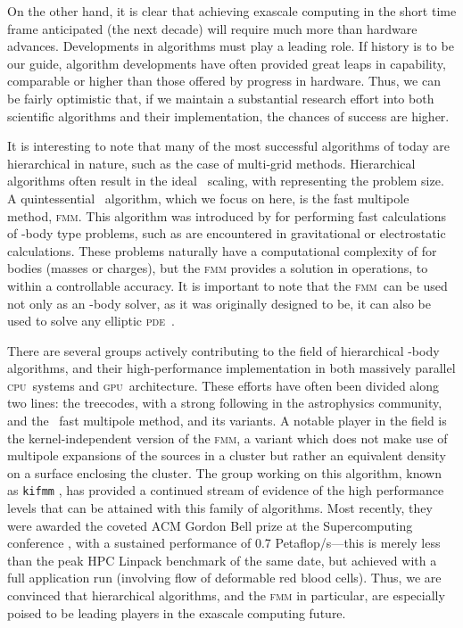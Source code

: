 \documentclass[10pt,twocolumn]{article}
\newcommand{\bigON}{\xspace}
\newcommand{\bigOsq}{\xspace}
\newcommand{\fmm}{\textsc{fmm}\xspace}
\newcommand{\pde}{\textsc{pde}}
\newcommand{\cpu}{\textsc{cpu}}
\newcommand{\gpu}{\textsc{gpu}}
\newlength{\up}
\begin{document}
On the other hand, it is clear that achieving exascale computing in the short time frame anticipated (the next decade) will require much more than hardware advances.  Developments in algorithms must play a leading role.  If history is to be our guide, algorithm developments have often provided great leaps in capability, comparable or higher than those offered by progress in hardware.  Thus, we can be fairly optimistic that, if we maintain a substantial research effort into both scientific algorithms and their implementation, the chances of success are higher.


It is interesting to note that many of the most successful algorithms of today are hierarchical in nature, such as the case of multi-grid methods.  Hierarchical algorithms often result in the ideal \bigON\ scaling, with  representing the problem size.  A quintessential \bigON\ algorithm, which we focus on here, is the fast multipole method, \fmm.  This algorithm was introduced by \cite{GreengardRokhlin1987} for performing fast calculations of -body type problems, such as are encountered in gravitational or electrostatic calculations.  These problems naturally have a computational complexity of \bigOsq for  bodies (masses or charges), but the \fmm provides a solution in \bigON operations, to within a controllable accuracy. It is important to note that the \fmm\ can be used not only  as an -body solver, as it was originally designed to be, it can also be used to solve any elliptic \pde\ \cite[e.g.,][]{EthridgeGreengard2001, ChengETal2006a,LangstonGreengardZorin2011}.

There are several groups actively contributing to the field of hierarchical -body algorithms, and their high-performance implementation in both massively parallel \cpu\ systems and \gpu\ architecture.  These efforts have often been divided along two lines:  the  treecodes, with a strong following in the astrophysics community, and the \bigON\ fast multipole method, and its variants.
A notable player in the field is the kernel-independent version of the \fmm, a variant which does not make use of multipole expansions of the sources in a cluster but rather an equivalent density on a surface enclosing the cluster. The group working on this algorithm, known as \texttt{kifmm} \cite[]{YingBirosZorin2004}, has provided a continued stream of evidence of the high performance levels that can be attained with this family of algorithms. Most recently, they were awarded the coveted ACM Gordon Bell prize at the Supercomputing conference \cite[]{RahimianETal2010}, with a sustained performance of 0.7 Petaflop/s---this is merely  less than the peak HPC Linpack benchmark of the same date, but achieved with a full application run (involving flow of deformable red blood cells). Thus, we are convinced that hierarchical algorithms, and the \fmm in particular, are especially poised to be leading players in the exascale computing future.
\end{document}
